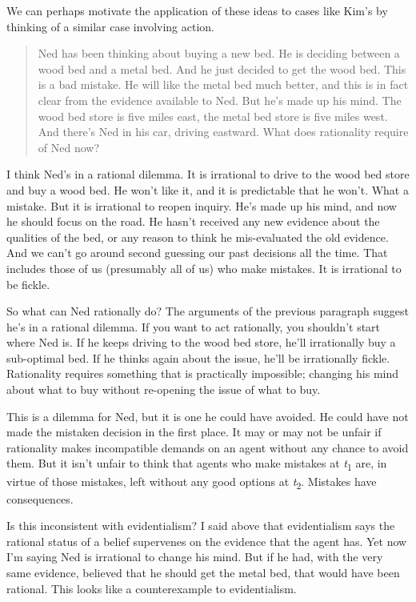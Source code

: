 \documentclass[
  10pt,
  letterpaper,
  DIV=11,
  numbers=noendperiod,
  twoside]{scrartcl}
\begin{document}
We can perhaps motivate the application of these ideas to cases like
Kim's by thinking of a similar case involving action.

\begin{quote}
Ned has been thinking about buying a new bed. He is deciding between a
wood bed and a metal bed. And he just decided to get the wood bed. This
is a bad mistake. He will like the metal bed much better, and this is in
fact clear from the evidence available to Ned. But he's made up his
mind. The wood bed store is five miles east, the metal bed store is five
miles west. And there's Ned in his car, driving eastward. What does
rationality require of Ned now?
\end{quote}

I think Ned's in a rational dilemma. It is irrational to drive to the
wood bed store and buy a wood bed. He won't like it, and it is
predictable that he won't. What a mistake. But it is irrational to
reopen inquiry. He's made up his mind, and now he should focus on the
road. He hasn't received any new evidence about the qualities of the
bed, or any reason to think he mis-evaluated the old evidence. And we
can't go around second guessing our past decisions all the time. That
includes those of us (presumably all of us) who make mistakes. It is
irrational to be fickle.

So what can Ned rationally do? The arguments of the previous paragraph
suggest he's in a rational dilemma. If you want to act rationally, you
shouldn't start where Ned is. If he keeps driving to the wood bed store,
he'll irrationally buy a sub-optimal bed. If he thinks again about the
issue, he'll be irrationally fickle. Rationality requires something that
is practically impossible; changing his mind about what to buy without
re-opening the issue of what to buy.

This is a dilemma for Ned, but it is one he could have avoided. He could
have not made the mistaken decision in the first place. It may or may
not be unfair if rationality makes incompatible demands on an agent
without any chance to avoid them. But it isn't unfair to think that
agents who make mistakes at \emph{t}\textsubscript{1} are, in virtue of
those mistakes, left without any good options at
\emph{t}\textsubscript{2}. Mistakes have consequences.

Is this inconsistent with evidentialism? I said above that evidentialism
says the rational status of a belief supervenes on the evidence that the
agent has. Yet now I'm saying Ned is irrational to change his mind. But
if he had, with the very same evidence, believed that he should get the
metal bed, that would have been rational. This looks like a
counterexample to evidentialism.
\end{document}
